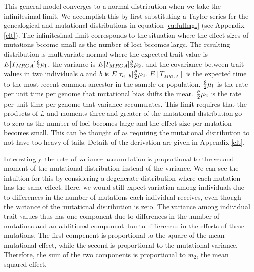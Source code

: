 This general model converges to a normal distribution when we take the
infinitesimal limit. We accomplish this by first substituting a Taylor series
for the genealogical and mutational distributions in equation \eqref{eq:fullmgf}
(see Appendix \ref{clt}). The infinitesimal limit corresponds to the situation
where the effect sizes of mutations become small as the number of loci becomes
large. The resulting distribution is multivariate normal where the expected
trait value is $E[T_{MRCA}] \frac{\theta}{2} \mu_1$, the variance is $E[T_{MRCA}] \frac{\theta}{2} \mu_2$,
and the covariance between trait values in two individuals $a$ and $b$ is
$E[\tau_{a+b}] \frac{\theta}{2} \mu_2$. $E[T_{MRCA}]$ is the expected time to the most recent
common ancestor in the sample or population. $\frac{\theta}{2} \mu_1$ is the rate per unit
time per genome that mutational bias shifts the mean. $\frac{\theta}{2} \mu_2$ is the rate per
unit time per genome that variance accumulates. This limit requires that the
products of $L$ and moments three and greater of the mutational distribution go
to zero as the number of loci becomes large and the effect size per mutation
becomes small. This can be thought of as requiring the mutational distribution
to not have too heavy of tails. Details of the derivation are given in
Appendix \ref{clt}.

Interestingly, the rate of variance accumulation is proportional to the second
moment of the mutational distribution instead of the variance. We can see the
intuition for this by considering a degenerate distribution where each mutation
has the same effect. Here, we would still expect variation among individuals due
to differences in the number of mutations each individual receives, even though
the variance of the mutational distribution is zero. The variance among
individual trait values thus has one component due to differences in the number
of mutations and an additional component due to differences in the effects of
these mutations. The first component is proportional to the square of the mean
mutational effect, while the second is proportional to the mutational variance.
Therefore, the sum of the two components is proportional to $m_2$, the mean
squared effect.

